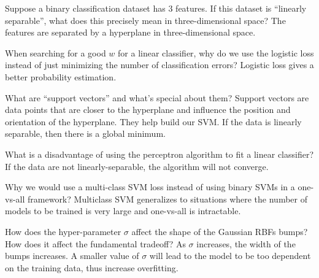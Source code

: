 \documentclass{article}
\def\red#1{{\color{red}#1}}
\begin{document}
{\item Suppose a binary classification dataset has 3 features. If this dataset is ``linearly separable'', what does this precisely mean in three-dimensional space? \red{The features are separated by a hyperplane in three-dimensional space.}
\item When searching for a good $w$ for a linear classifier, why do we use the logistic loss instead of just minimizing the number of classification errors? \red{Logistic loss gives a better probability estimation.}
\item What are ``support vectors'' and what's special about them? \red{Support vectors are data points that are closer to the hyperplane and influence the position and orientation of the hyperplane. They help build our SVM. If the data is linearly separable, then there is a global minimum.}
\item What is a disadvantage of using the perceptron algorithm to fit a linear classifier? \red{If the data are not linearly-separable, the algorithm will not converge.}
\item Why we would use a multi-class SVM loss instead of using binary SVMs in a one-vs-all framework?
\red{Multiclass SVM generalizes to situations where the number of models to be trained is very large and one-vs-all is intractable.}
\item How does the hyper-parameter $\sigma$ affect the shape of the Gaussian RBFs bumps? How does it affect the fundamental tradeoff? \red{As $\sigma$ increases, the width of the  bumps increases. A smaller value of $\sigma$ will lead to the model to be too dependent on the training data, thus increase overfitting.}
}
\end{document}
